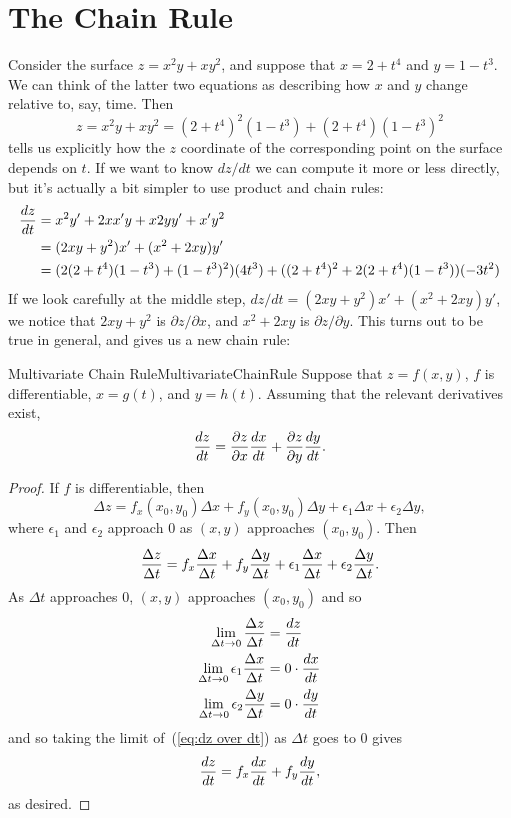 \section{The Chain Rule}\label{sec:multivariable chain rules}

Consider the surface $z=x^2y+xy^2$, and suppose that 
$x=2+t^4$ and $y=1-t^3$. We can think of the latter two equations as
describing how $x$ and $y$ change relative to, say, time. Then
$$z=x^2y+xy^2=(2+t^4)^2(1-t^3)+(2+t^4)(1-t^3)^2$$ 
tells us explicitly how the $z$ coordinate of the corresponding point on the
surface depends on $t$. If we want to know $dz/dt$ we can compute it
more or less directly, but it's actually a bit simpler to use product and chain
rules:
\begin{align*}
  {dz\over dt}&=x^2y'+2xx'y+x2yy'+x'y^2	\\
  &=(2xy+y^2)x'+(x^2+2xy)y'	\\
  &=(2(2+t^4)(1-t^3)+(1-t^3)^2)(4t^3)+((2+t^4)^2+2(2+t^4)(1-t^3))(-3t^2)	\\
\end{align*}
If we look carefully at the middle step,
$dz/dt=(2xy+y^2)x'+(x^2+2xy)y'$, we notice that $2xy+y^2$ is $\partial
z/\partial x$, and $x^2+2xy$ is $\partial z/\partial y$.
This turns out to be true in general, and gives us a new chain rule:

\begin{theorem}{Multivariate Chain Rule}{MultivariateChainRule}
Suppose that $z=f(x,y)$, $f$ is differentiable,
$x=g(t)$, and $y=h(t)$.
Assuming that the relevant derivatives exist, 
$${dz\over dt}={\partial z\over \partial x}{dx\over dt}+
{\partial z\over \partial y}{dy\over dt}.
$$ 
\end{theorem}
\begin{proof}
If $f$ is differentiable, then 
$$\Delta z=f_x(x_0,y_0)\Delta x+f_y(x_0,y_0)\Delta y+\epsilon_1\Delta
x + \epsilon_2\Delta y,$$
where $\epsilon_1$ and $\epsilon_2$ approach 0 as 
$(x,y)$ approaches $(x_0,y_0)$. Then
\begin{equation}\label{eq:dz over dt}
{\Delta z\over\Delta t}=
f_x{\Delta x\over\Delta t}+f_y{\Delta y\over\Delta t}+\epsilon_1{\Delta
x\over\Delta t} + \epsilon_2{\Delta y\over\Delta t}.
\end{equation}
As $\Delta t$ approaches 0, $(x,y)$ approaches $(x_0,y_0)$ and so
\begin{align*}
\lim_{\Delta t\to0}{\Delta z\over\Delta t} &=  {dz\over dt}	\\
\lim_{\Delta t\to0}\epsilon_1{\Delta x\over\Delta t} &= 0\cdot{dx\over dt}	\\
\lim_{\Delta t\to0}\epsilon_2{\Delta y\over\Delta t} &= 0\cdot{dy\over dt}	\\
\end{align*}
and so taking the limit of~(\ref{eq:dz over dt})
 as $\Delta t$ goes to 0 gives 
$$
{dz\over dt}=
f_x{dx\over dt}+f_y{dy\over dt},
$$
as desired.
\end{proof}

